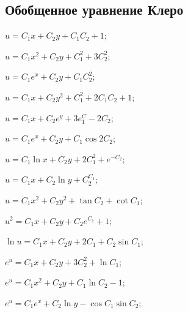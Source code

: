 \subsection*{Обобщенное уравнение Клеро}

	\begin{enumsols}

		\item \( u = C_1 x + C_2 y + C_1 C_2 + 1 \); \sfill %
		\item \( u = C_1 x^2 + C_2 y + C_1^2 + 3 C_2^2 \); \sfill %
		\item \( u = C_1 e^x + C_2 y + C_1 C_2^2 \); \sfill %
		\item \( u = C_1 x + C_2 y^2 + C_1^2 + 2 C_1 C_2 + 1 \); \sfill %
		\item \( u = C_1 x + C_2 e^y + 3 e^C_1 - 2 C_2 \); \sfill %
		\item \( u = C_1 e^x + C_2 y + C_1 \cos{2 C_2}  \); \sfill %
		\item \( u = C_1 \ln{x} + C_2 y + 2 C_1^2 + e^{-C_2}  \); \sfill %
		\item \( u = C_1 x + C_2 \ln{y} + C_2^{C_1} \); \sfill %
		
		\label{sol:charpit_clauret:simple_changes_part2}
		\item \( u = C_1 x^2 + C_2 y^2 + \tan{C_2} + \cot{C_1} \); \sfill %
		\item \( u^2 = C_1 x + C_2 y + C_2 e^{C_1} + 1 \); \sfill %
		\item \( \ln{u} = C_1 x + C_2 y + 2 C_1 + C_2 \sin{C_1}  \); \sfill %
		\item \( e^u = C_1 x + C_2 y + 3 C_2^2 + \ln{C_1}  \); \sfill %
		\item \( e^u = C_1 x^2 + C_2 y + C_1 \ln{C_2} - 1 \); \sfill %
		\item \( e^u = C_1 e^x + C_2 \ln{y} - \cos{C_1} \sin{C_2} \); \sfill %


\end{enumsols}
